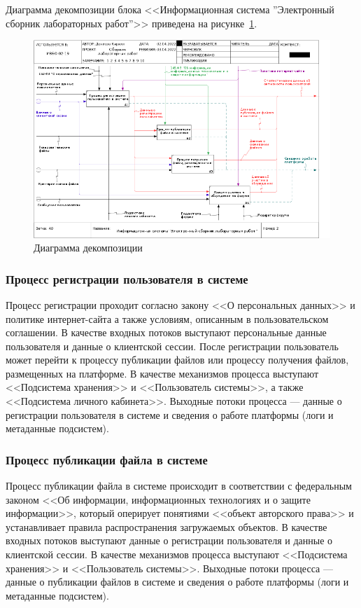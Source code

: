\documentclass[a4paper,14pt]{extarticle}
\begin{document}
Диаграмма декомпозиции блока <<Информационная система ''Электронный сборник лабораторных работ''>> приведена на рисунке~\ref{fig:02a0}.

\begin{figure}[h!]
	\centering
	\includegraphics[width=\linewidth]{images/ramus/02_A0}
	\caption{Диаграмма декомпозиции}
	\label{fig:02a0}
\end{figure}


\subsubsection{Процесс регистрации пользователя в системе}

Процесс регистрации проходит согласно закону <<О персональных данных>> и политике интернет-сайта а также условиям, описанным в пользовательском соглашении.  
В качестве входных потоков выступают персональные данные пользователя и данные о клиентской сессии.
После регистрации пользователь может перейти к процессу публикации файлов или процессу получения файлов, размещенных на платформе. В качестве механизмов процесса выступают <<Подсистема хранения>> и <<Пользователь системы>>, а также <<Подсистема личного кабинета>>. Выходные потоки процесса --- данные о регистрации пользователя в системе и сведения о работе платформы (логи и метаданные подсистем).



\subsubsection{Процесс публикации файла в системе}
Процесс публикации файла в системе происходит в соответствии с федеральным законом <<Об информации, информационных технологиях и о защите информации>>, который оперирует понятиями <<объект авторского права>> и устанавливает правила распространения загружаемых объектов. В качестве входных потоков выступают данные о регистрации пользователя и данные о клиентской сессии. В качестве механизмов процесса выступают <<Подсистема хранения>> и <<Пользователь системы>>. Выходные потоки процесса --- данные о публикации файлов в системе и сведения о работе платформы (логи и метаданные подсистем).
\end{document}
